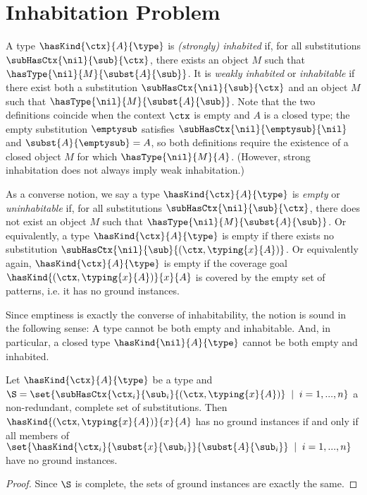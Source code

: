 
\section*{Inhabitation Problem}

A type $\hasKind{\ctx}{A}{\type}$ is \textit{(strongly) inhabited} if, for all substitutions $\subHasCtx{\nil}{\sub}{\ctx}$, there exists an object $M$ such that $\hasType{\nil}{M}{\subst{A}{\sub}}$.
It is \textit{weakly inhabited} or \textit{inhabitable} if there exist both a substitution $\subHasCtx{\nil}{\sub}{\ctx}$ and an object $M$ such that $\hasType{\nil}{M}{\subst{A}{\sub}}$.
Note that the two definitions coincide when the context $\ctx$ is empty and $A$ is a closed type; the empty substitution $\emptysub$ satisfies $\subHasCtx{\nil}{\emptysub}{\nil}$ and $\subst{A}{\emptysub} = A$, so both definitions require the existence of a closed object $M$ for which $\hasType{\nil}{M}{A}$.
(However, strong inhabitation does not always imply weak inhabitation.)

As a converse notion, we say a type $\hasKind{\ctx}{A}{\type}$ is \textit{empty} or \textit{uninhabitable} if, for all substitutions $\subHasCtx{\nil}{\sub}{\ctx}$, there does not exist an object $M$ such that $\hasType{\nil}{M}{\subst{A}{\sub}}$.
Or equivalently, a type $\hasKind{\ctx}{A}{\type}$ is empty if there exists no substitution $\subHasCtx{\nil}{\sub}{(\ctx, \typing{x}{A})}$.
Or equivalently again, $\hasKind{\ctx}{A}{\type}$ is empty if the coverage goal $\hasKind{(\ctx, \typing{x}{A})}{x}{A}$ is covered by the empty set of patterns, i.e. it has no ground instances.

Since emptiness is exactly the converse of inhabitability, the notion is sound in the following sense:
A type cannot be both empty and inhabitable.
And, in particular, a closed type $\hasKind{\nil}{A}{\type}$ cannot be both empty and inhabited.

\begin{theorem}
Let $\hasKind{\ctx}{A}{\type}$ be a type and $\S = \set{\subHasCtx{\ctx_i}{\sub_i}{(\ctx, \typing{x}{A})} \;\;|\;\; i = 1, ..., n}$ a non-redundant, complete set of substitutions.
Then $\hasKind{(\ctx, \typing{x}{A})}{x}{A}$ has no ground instances if and only if all members of $\set{\hasKind{\ctx_i}{\subst{x}{\sub_i}}{\subst{A}{\sub_i}} \;\;|\;\; i = 1, ..., n}$ have no ground instances.
\end{theorem}

\begin{proof}
Since $\S$ is complete, the sets of ground instances are exactly the same.
\end{proof}

